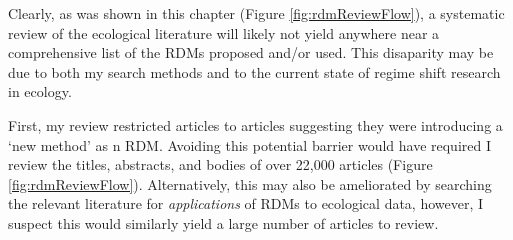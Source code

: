 \documentclass[12pt,twoside,openany]{reedthesis}
\begin{document}
Clearly, as was shown in this chapter (Figure \ref{fig:rdmReviewFlow}),
a systematic review of the ecological literature will likely not yield
anywhere near a comprehensive list of the RDMs proposed and/or used.
This disaparity may be due to both my search methods and to the current
state of regime shift research in ecology.

First, my review restricted articles to articles suggesting they were
introducing a `new method' as n RDM. Avoiding this potential barrier
would have required I review the titles, abstracts, and bodies of over
22,000 articles (Figure \ref{fig:rdmReviewFlow}). Alternatively, this
may also be ameliorated by searching the relevant literature for
\emph{applications} of RDMs to ecological data, however, I suspect this
would similarly yield a large number of articles to review.
\end{document}
